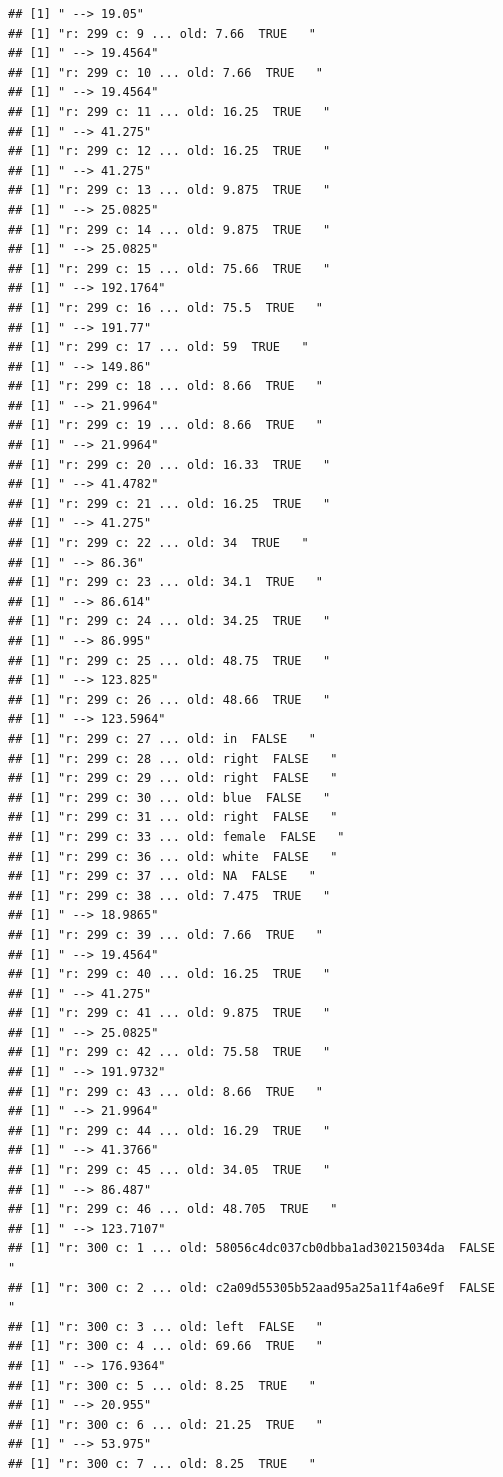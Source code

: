 \documentclass[]{article}
\begin{document}
\begin{verbatim}
## [1] " --> 19.05"
## [1] "r: 299 c: 9 ... old: 7.66  TRUE   "
## [1] " --> 19.4564"
## [1] "r: 299 c: 10 ... old: 7.66  TRUE   "
## [1] " --> 19.4564"
## [1] "r: 299 c: 11 ... old: 16.25  TRUE   "
## [1] " --> 41.275"
## [1] "r: 299 c: 12 ... old: 16.25  TRUE   "
## [1] " --> 41.275"
## [1] "r: 299 c: 13 ... old: 9.875  TRUE   "
## [1] " --> 25.0825"
## [1] "r: 299 c: 14 ... old: 9.875  TRUE   "
## [1] " --> 25.0825"
## [1] "r: 299 c: 15 ... old: 75.66  TRUE   "
## [1] " --> 192.1764"
## [1] "r: 299 c: 16 ... old: 75.5  TRUE   "
## [1] " --> 191.77"
## [1] "r: 299 c: 17 ... old: 59  TRUE   "
## [1] " --> 149.86"
## [1] "r: 299 c: 18 ... old: 8.66  TRUE   "
## [1] " --> 21.9964"
## [1] "r: 299 c: 19 ... old: 8.66  TRUE   "
## [1] " --> 21.9964"
## [1] "r: 299 c: 20 ... old: 16.33  TRUE   "
## [1] " --> 41.4782"
## [1] "r: 299 c: 21 ... old: 16.25  TRUE   "
## [1] " --> 41.275"
## [1] "r: 299 c: 22 ... old: 34  TRUE   "
## [1] " --> 86.36"
## [1] "r: 299 c: 23 ... old: 34.1  TRUE   "
## [1] " --> 86.614"
## [1] "r: 299 c: 24 ... old: 34.25  TRUE   "
## [1] " --> 86.995"
## [1] "r: 299 c: 25 ... old: 48.75  TRUE   "
## [1] " --> 123.825"
## [1] "r: 299 c: 26 ... old: 48.66  TRUE   "
## [1] " --> 123.5964"
## [1] "r: 299 c: 27 ... old: in  FALSE   "
## [1] "r: 299 c: 28 ... old: right  FALSE   "
## [1] "r: 299 c: 29 ... old: right  FALSE   "
## [1] "r: 299 c: 30 ... old: blue  FALSE   "
## [1] "r: 299 c: 31 ... old: right  FALSE   "
## [1] "r: 299 c: 33 ... old: female  FALSE   "
## [1] "r: 299 c: 36 ... old: white  FALSE   "
## [1] "r: 299 c: 37 ... old: NA  FALSE   "
## [1] "r: 299 c: 38 ... old: 7.475  TRUE   "
## [1] " --> 18.9865"
## [1] "r: 299 c: 39 ... old: 7.66  TRUE   "
## [1] " --> 19.4564"
## [1] "r: 299 c: 40 ... old: 16.25  TRUE   "
## [1] " --> 41.275"
## [1] "r: 299 c: 41 ... old: 9.875  TRUE   "
## [1] " --> 25.0825"
## [1] "r: 299 c: 42 ... old: 75.58  TRUE   "
## [1] " --> 191.9732"
## [1] "r: 299 c: 43 ... old: 8.66  TRUE   "
## [1] " --> 21.9964"
## [1] "r: 299 c: 44 ... old: 16.29  TRUE   "
## [1] " --> 41.3766"
## [1] "r: 299 c: 45 ... old: 34.05  TRUE   "
## [1] " --> 86.487"
## [1] "r: 299 c: 46 ... old: 48.705  TRUE   "
## [1] " --> 123.7107"
## [1] "r: 300 c: 1 ... old: 58056c4dc037cb0dbba1ad30215034da  FALSE   "
## [1] "r: 300 c: 2 ... old: c2a09d55305b52aad95a25a11f4a6e9f  FALSE   "
## [1] "r: 300 c: 3 ... old: left  FALSE   "
## [1] "r: 300 c: 4 ... old: 69.66  TRUE   "
## [1] " --> 176.9364"
## [1] "r: 300 c: 5 ... old: 8.25  TRUE   "
## [1] " --> 20.955"
## [1] "r: 300 c: 6 ... old: 21.25  TRUE   "
## [1] " --> 53.975"
## [1] "r: 300 c: 7 ... old: 8.25  TRUE   "

\end{verbatim}
\end{document}
